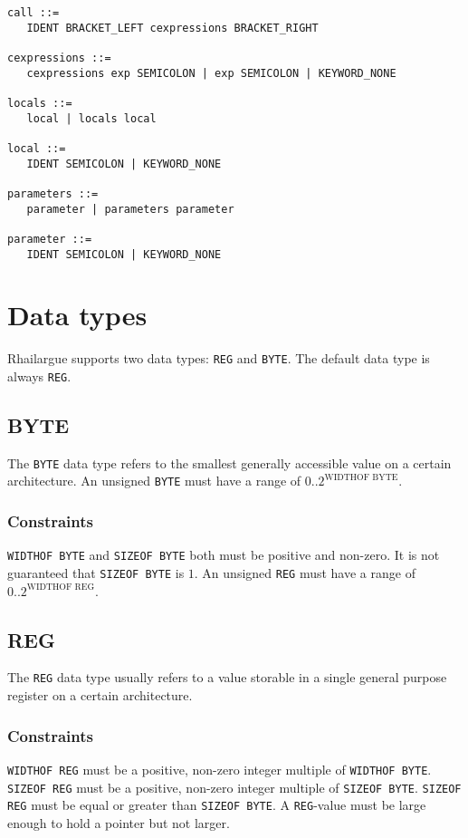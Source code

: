 \begin{verbatim}
call ::= 
   IDENT BRACKET_LEFT cexpressions BRACKET_RIGHT

cexpressions ::=
   cexpressions exp SEMICOLON | exp SEMICOLON | KEYWORD_NONE

locals ::=
   local | locals local

local ::= 
   IDENT SEMICOLON | KEYWORD_NONE

parameters ::= 
   parameter | parameters parameter

parameter ::=
   IDENT SEMICOLON | KEYWORD_NONE
\end{verbatim}

\section{Data types}

Rhailargue supports two data types: \verb|REG| and \verb|BYTE|. The default data type is always \verb|REG|. 

\subsection{BYTE}

The \verb|BYTE| data type refers to the smallest generally accessible value on a certain architecture. An unsigned \verb|BYTE| must have a range of
$0 .. 2^{\text{WIDTHOF BYTE}}$.

\subsubsection{Constraints}

\verb|WIDTHOF BYTE| and \verb|SIZEOF BYTE| both must be positive and non-zero. It is not guaranteed that \verb|SIZEOF BYTE| is $1$. An unsigned \verb|REG| must have a range of $0 .. 2^{\text{WIDTHOF REG}}$.

\subsection{REG}

The \verb|REG| data type usually refers to a value storable in a single general purpose register on a certain architecture. 

\subsubsection{Constraints}

\verb|WIDTHOF REG| must be a positive, non-zero integer multiple of \verb|WIDTHOF BYTE|. \verb|SIZEOF REG| must be a positive, non-zero integer multiple of \verb|SIZEOF BYTE|. \verb|SIZEOF REG| must be equal or greater than \verb|SIZEOF BYTE|. A \verb|REG|-value must be large enough to hold a pointer but not larger. 

